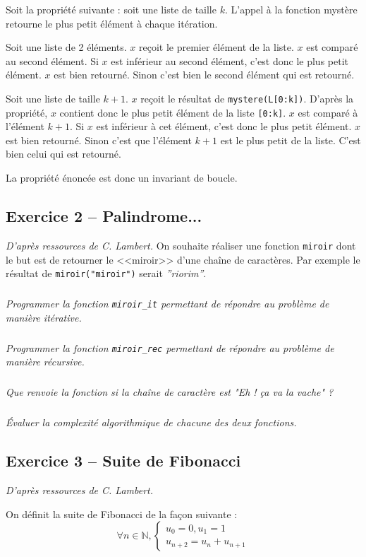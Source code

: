 \documentclass[10pt,fleqn]{article} %
\begin{document}
\begin{multicols}{2}
\begin{corrige}
\vspace{.25cm}

Soit la propriété suivante : soit une liste de taille $k$. L'appel à la fonction mystère retourne le plus petit élément à chaque itération. 

Soit une liste de 2 éléments. $x$ reçoit le premier élément de la liste. $x$ est comparé au second élément. Si $x$ est inférieur au second élément, c'est donc le plus petit élément. $x$ est bien retourné. Sinon c'est bien le second élément qui est retourné. 


Soit une liste de taille $k+1$.  $x$ reçoit le résultat de \texttt{mystere(L[0:k])}. D'après la propriété, $x$ contient donc le plus petit élément de la liste \texttt{[0:k]}. $x$ est comparé à l'élément $k+1$. Si $x$ est inférieur à cet élément, c'est donc le plus petit élément. $x$ est bien retourné. Sinon c'est que l'élément $k+1$ est le plus petit de la liste. C'est bien celui qui est retourné. 

La propriété énoncée est donc un invariant de boucle.
\end{corrige}
\else
\fi

\subsection*{Exercice 2 -- Palindrome...}
\textit{D'après ressources de C. Lambert.}
\setcounter{exo}{0}
On souhaite réaliser une fonction \texttt{miroir} dont le but est de retourner le <<miroir>> d'une chaîne de caractères. Par exemple le résultat de \texttt{miroir("miroir")} serait \textsl{''riorim''}.

\subparagraph{}
\textit{Programmer la fonction \texttt{miroir\_it} permettant de répondre au problème de manière itérative.}


\subparagraph{}
\textit{Programmer la fonction \texttt{miroir\_rec} permettant de répondre au problème de manière récursive.}


\subparagraph{}
\textit{Que renvoie la fonction si la chaîne de caractère est "Eh ! ça va la vache" ?}
 
 \subparagraph{}
\textit{Évaluer la complexité algorithmique de chacune des deux fonctions.}

 
\subsection*{Exercice 3 -- Suite de Fibonacci}
\textit{D'après ressources de C. Lambert.}

\setcounter{exo}{0}
On définit la suite de Fibonacci de la façon suivante : 
$$
\forall n\in \mathbb{N}, \left\{ \begin{array}{l}
u_0 = 0, u_1 = 1 \\
u_{n+2} = u_{n} + u_{n+1}
\end{array}\right.
$$


\end{multicols}
\end{document}
